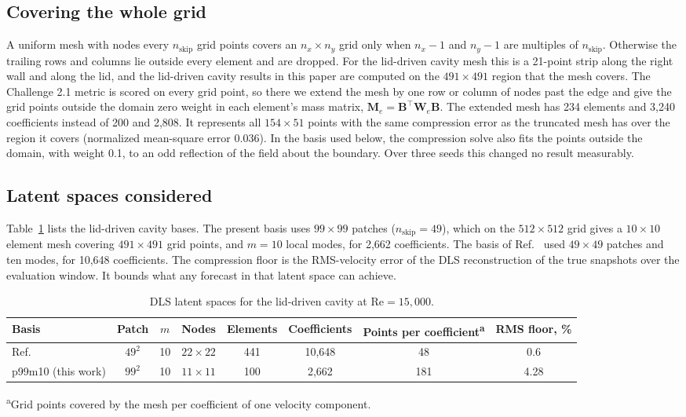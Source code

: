 \documentclass[conf]{new-aiaa}
\newcommand{\Rey}{\mathrm{Re}}
\begin{document}
\subsection{Covering the whole grid}
\label{sec:fullcover}
A uniform mesh with nodes every $n_\mathrm{skip}$ grid points covers an $n_x\times n_y$ grid only when $n_x-1$ and $n_y-1$ are multiples of $n_\mathrm{skip}$. Otherwise the trailing rows and columns lie outside every element and are dropped. For the lid-driven cavity mesh this is a 21-point strip along the right wall and along the lid, and the lid-driven cavity results in this paper are computed on the $491\times491$ region that the mesh covers. The Challenge 2.1 metric is scored on every grid point, so there we extend the mesh by one row or column of nodes past the edge and give the grid points outside the domain zero weight in each element's mass matrix, $\mathbf{M}_e=\mathbf{B}^{\top}\mathbf{W}_e\mathbf{B}$. The extended mesh has 234 elements and 3,240 coefficients instead of 200 and 2,808. It represents all $154\times51$ points with the same compression error as the truncated mesh has over the region it covers (normalized mean-square error 0.036). In the basis used below, the compression solve also fits the points outside the domain, with weight 0.1, to an odd reflection of the field about the boundary. Over three seeds this changed no result measurably.

\subsection{Latent spaces considered}
Table~\ref{tab:latent} lists the lid-driven cavity bases. The present basis uses $99\times99$ patches ($n_\mathrm{skip}=49$), which on the $512\times512$ grid gives a $10\times10$ element mesh covering $491\times491$ grid points, and $m=10$ local modes, for 2,662 coefficients. The basis of Ref.~\cite{morton2026scitech} used $49\times49$ patches and ten modes, for 10,648 coefficients. The compression floor is the RMS-velocity error of the DLS reconstruction of the true snapshots over the evaluation window. It bounds what any forecast in that latent space can achieve.

\begin{table}[!tbp]
  \centering
  \small
  \caption{DLS latent spaces for the lid-driven cavity at $\Rey=15{,}000$.}
  \label{tab:latent}
  \begin{tabular}{lccccccc}
    \toprule
    Basis & Patch & $m$ & Nodes & Elements & Coefficients & Points per coefficient\textsuperscript{a} & RMS floor, \% \\
    \midrule
    Ref.~\cite{morton2026scitech} & $49^2$ & 10 & $22\times22$ & 441 & 10,648 & 48 & 0.6 \\
    p99m10 (this work) & $99^2$ & 10 & $11\times11$ & 100 & 2,662 & 181 & 4.28 \\
    \bottomrule
  \end{tabular}

  \smallskip
  {\footnotesize \textsuperscript{a}Grid points covered by the mesh per coefficient of one velocity component.}
\end{table}
\end{document}
